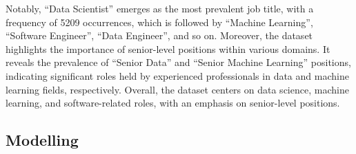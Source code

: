 \documentclass[11pt,]{article}
\begin{document}
Notably, ``Data Scientist'' emerges as the most prevalent job title,
with a frequency of 5209 occurrences, which is followed by ``Machine
Learning'', ``Software Engineer'', ``Data Engineer'', and so on.
Moreover, the dataset highlights the importance of senior-level
positions within various domains. It reveals the prevalence of ``Senior
Data'' and ``Senior Machine Learning'' positions, indicating significant
roles held by experienced professionals in data and machine learning
fields, respectively. Overall, the dataset centers on data science,
machine learning, and software-related roles, with an emphasis on
senior-level positions.

\hypertarget{modelling}{%
\subsection{Modelling}\label{modelling}}
\end{document}
